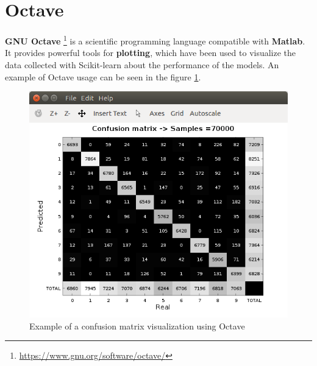 \section{Octave} \label{sec:octave}
\textbf{GNU Octave} \footnote{\url{https://www.gnu.org/software/octave/}} is a scientific programming language compatible with \textbf{Matlab}. It provides powerful tools for \textbf{plotting}, which have been used to visualize the data collected with Scikit-learn about the performance of the models. An example of Octave usage can be seen in the figure \ref{fig:conf_mat}.
\begin{figure}
	\centering
	\includegraphics[width=12cm, keepaspectratio]{figures/conf_mat.png}
	\caption{Example of a confusion matrix visualization using Octave}
	\label{fig:conf_mat}
\end{figure}